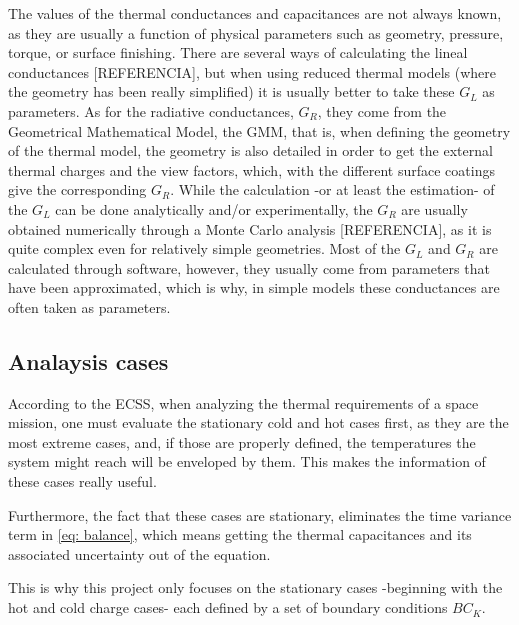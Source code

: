 The values of the thermal conductances and capacitances are not always known, as they are usually a function of physical parameters such as geometry, pressure, torque, or surface finishing. There are several ways of calculating the lineal conductances [REFERENCIA], but when using reduced thermal models (where the geometry has been really simplified) it is usually better to take these $G_L$ as parameters. As for the radiative conductances, $G_R$, they come from the Geometrical Mathematical Model, the GMM, that is, when defining the geometry of the thermal model, the geometry is also detailed in order to get the external thermal charges and the view factors, which, with the different surface coatings give the corresponding $G_R$. While the calculation -or at least the estimation- of the $G_L$ can be done analytically and/or experimentally, the $G_R$ are usually obtained numerically through a Monte Carlo analysis [REFERENCIA], as it is quite complex even for relatively simple geometries.  Most of the $G_L$ and $G_R$ are calculated through software, however, they usually come from parameters that have been approximated, which is why, in simple models these conductances are often taken as parameters.

\subsection{Analaysis cases}
According to the ECSS, when analyzing the thermal requirements of a space mission, one must evaluate the stationary cold and hot cases first, as they are the most extreme cases, and, if those are properly defined, the temperatures the system might reach will be enveloped by them. This makes the information of these cases really useful.

Furthermore, the fact that these cases are stationary, eliminates the time variance term in \autoref{eq: balance}, which means getting the thermal capacitances and its associated uncertainty out of the equation.

This is why this project only focuses on the stationary cases -beginning with the hot and cold charge cases- each defined by a set of boundary conditions $BC_K$.

